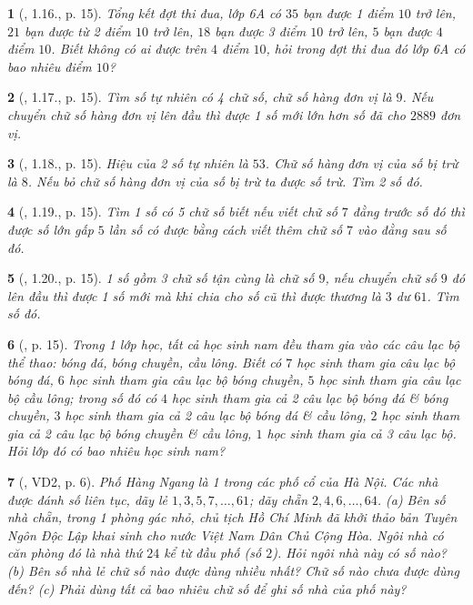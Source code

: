 \documentclass{article}
\newtheorem{baitoan}{}
\begin{document}
\begin{baitoan}[\cite{Binh_boi_duong_Toan_6_tap_1}, 1.16., p. 15]
	Tổng kết đợt thi đua, lớp 6A có $35$ bạn được 1 điểm $10$ trở lên, $21$ bạn được từ 2 điểm $10$ trở lên, $18$ bạn được 3 điểm $10$ trở lên, $5$ bạn được $4$ điểm $10$. Biết không có ai được trên $4$ điểm $10$, hỏi trong đợt thi đua đó lớp 6A có bao nhiêu điểm $10$?
\end{baitoan}

\begin{baitoan}[\cite{Binh_boi_duong_Toan_6_tap_1}, 1.17., p. 15]
	Tìm số tự nhiên có 4 chữ số, chữ số hàng đơn vị là $9$. Nếu chuyển chữ số hàng đơn vị lên đầu thì được 1 số mới lớn hơn số đã cho $2889$ đơn vị.
\end{baitoan}

\begin{baitoan}[\cite{Binh_boi_duong_Toan_6_tap_1}, 1.18., p. 15]
	Hiệu của 2 số tự nhiên là $53$. Chữ số hàng đơn vị của số bị trừ là $8$. Nếu bỏ chữ số hàng đơn vị của số bị trừ ta được số trừ. Tìm 2 số đó.
\end{baitoan}

\begin{baitoan}[\cite{Binh_boi_duong_Toan_6_tap_1}, 1.19., p. 15]
	Tìm 1 số có 5 chữ số biết nếu viết chữ số $7$ đằng trước số đó thì được số lớn gấp $5$ lần số có được bằng cách viết thêm chữ số $7$ vào đằng sau số đó.
\end{baitoan}

\begin{baitoan}[\cite{Binh_boi_duong_Toan_6_tap_1}, 1.20., p. 15]
	1 số gồm 3 chữ số tận cùng là chữ số $9$, nếu chuyển chữ số $9$ đó lên đầu thì được 1 số mới mà khi chia cho số cũ thì được thương là $3$ dư $61$. Tìm số đó.
\end{baitoan}

\begin{baitoan}[\cite{Binh_boi_duong_Toan_6_tap_1}, p. 15]
	Trong 1 lớp học, tất cả học sinh nam đều tham gia vào các câu lạc bộ thể thao: bóng đá, bóng chuyền, cầu lông. Biết có $7$ học sinh tham gia câu lạc bộ bóng đá, $6$ học sinh tham gia câu lạc bộ bóng chuyền, $5$ học sinh tham gia câu lạc bộ cầu lông; trong số đó có $4$ học sinh tham gia cả 2 câu lạc bộ bóng đá \& bóng chuyền, $3$ học sinh tham gia cả 2 câu lạc bộ bóng đá \& cầu lông, $2$ học sinh tham gia cả 2 câu lạc bộ bóng chuyền \& cầu lông, $1$ học sinh tham gia cả 3 câu lạc bộ. Hỏi lớp đó có bao nhiêu học sinh nam?
\end{baitoan}

\begin{baitoan}[\cite{Tuyen_Toan_6}, VD2, p. 6]
	Phố Hàng Ngang là 1 trong các phố cổ của Hà Nội. Các nhà được đánh số liên tục, dãy lẻ $1,3,5,7,\ldots,61$; dãy chẵn $2,4,6,\ldots,64$. (a) Bên số nhà chẵn, trong 1 phòng gác nhỏ, chủ tịch Hồ Chí Minh đã khởi thảo bản Tuyên Ngôn Độc Lập khai sinh cho nước Việt Nam Dân Chủ Cộng Hòa. Ngôi nhà có căn phòng đó là nhà thứ $24$ kể từ đầu phố (số $2$). Hỏi ngôi nhà này có số nào? (b) Bên số nhà lẻ chữ số nào được dùng nhiều nhất? Chữ số nào chưa được dùng đến? (c) Phải dùng tất cả bao nhiêu chữ số để ghi số nhà của phố này?
\end{baitoan}
\end{document}
